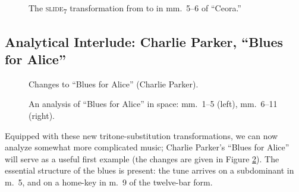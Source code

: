\begin{figure}[htbp]
  \caption{The \textsc{slide}\textsubscript{7} transformation from \protect{} to
    \protect{} in mm.~5--6 of ``Ceora.''}
  \label{tft:slide7-ceora}
\end{figure}




\subsection{Analytical Interlude: Charlie Parker, “Blues for Alice”}
\label{sec:blues-for-alice}

\begin{figure}[tbp]
  \caption{Changes to ``Blues for Alice'' (Charlie Parker).}
  \label{tft:blues-alice-changes}
\end{figure}
\begin{figure}[btp]
  \caption[An analysis of ``Blues for Alice'' in \tf space]{An analysis of
    ``Blues for Alice'' in \tf space: mm.~1--5 (left), mm.~6--11 (right).}
  \label{tft:blues-alice-space}
\end{figure}

Equipped with these new tritone-substitution transformations, we can now
analyze somewhat more complicated music; Charlie Parker’s “Blues for Alice”
will serve as a useful first example (the changes are given in Figure
\ref{tft:blues-alice-changes}). The essential structure of the blues is
present: the tune arrives on a subdominant in m.~5, and on a home-key \tf in
m.~9 of the twelve-bar form.



